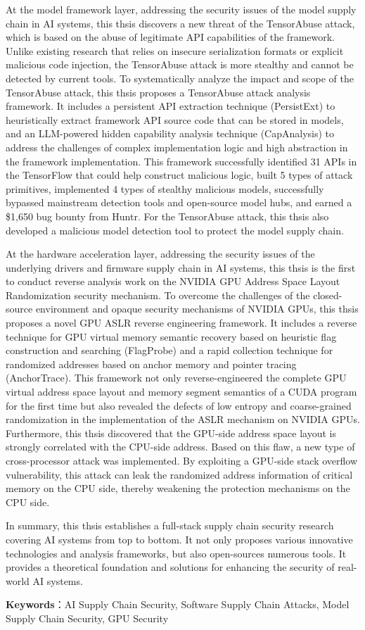 At the model framework layer, addressing the security issues of the model supply chain in AI systems, this thsis discovers a new threat of the TensorAbuse attack, which is based on the abuse of legitimate API capabilities of the framework. Unlike existing research that relies on insecure serialization formats or explicit malicious code injection, the TensorAbuse attack is more stealthy and cannot be detected by current tools. To systematically analyze the impact and scope of the TensorAbuse attack, this thsis proposes a TensorAbuse attack analysis framework. It includes a persistent API extraction technique (PersistExt) to heuristically extract framework API source code that can be stored in models, and an LLM-powered hidden capability analysis technique (CapAnalysis) to address the challenges of complex implementation logic and high abstraction in the framework implementation. This framework successfully identified 31 APIs in the TensorFlow that could help construct malicious logic, built 5 types of attack primitives, implemented 4 types of stealthy malicious models, successfully bypassed mainstream detection tools and open-source model hubs, and earned a \$1,650 bug bounty from Huntr. For the TensorAbuse attack, this thsis also developed a malicious model detection tool to protect the model supply chain.

At the hardware acceleration layer, addressing the security issues of the underlying drivers and firmware supply chain in AI systems, this thsis is the first to conduct reverse analysis work on the NVIDIA GPU Address Space Layout Randomization security mechanism. To overcome the challenges of the closed-source environment and opaque security mechanisms of NVIDIA GPUs, this thsis proposes a novel GPU ASLR reverse engineering framework. It includes a reverse technique for GPU virtual memory semantic recovery based on heuristic flag construction and searching (FlagProbe) and a rapid collection technique for randomized addresses based on anchor memory and pointer tracing (AnchorTrace). This framework not only reverse-engineered the complete GPU virtual address space layout and memory segment semantics of a CUDA program for the first time but also revealed the defects of low entropy and coarse-grained randomization in the implementation of the ASLR mechanism on NVIDIA GPUs. Furthermore, this thsis discovered that the GPU-side address space layout is strongly correlated with the CPU-side address. Based on this flaw, a new type of cross-processor attack was implemented. By exploiting a GPU-side stack overflow vulnerability, this attack can leak the randomized address information of critical memory on the CPU side, thereby weakening the protection mechanisms on the CPU side.

In summary, this thsis establishes a full-stack supply chain security research covering AI systems from top to bottom. It not only proposes various innovative technologies and analysis frameworks, but also open-sources numerous tools. It provides a theoretical foundation and solutions for enhancing the security of real-world AI systems.

\bigskip
\noindent \textbf{Keywords}：AI Supply Chain Security, Software Supply Chain Attacks, Model Supply Chain Security, GPU Security
